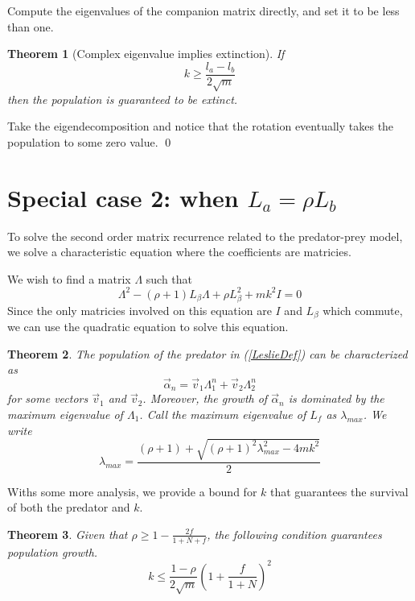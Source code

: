 \documentclass{article}
\newtheorem{theorem}{Theorem}
\begin{document}
\proof Compute the eigenvalues of the companion matrix directly, 
and set it to be less than one. 

\begin{theorem}[Complex eigenvalue implies extinction]
If 
\[
    k \geq \frac {l_a - l_b} {2\sqrt{m}}
\]
then the population is guaranteed to be extinct. 
\end{theorem}

\proof Take the eigendecomposition and notice that the rotation 
eventually takes the population to some zero value. 
\hfill \qed

\section{Special case 2: when $L_a = \rho L_b$}

To solve the second order matrix 
recurrence related to 
the predator-prey model, 
we solve a characteristic equation 
where the coefficients are matricies.

We wish to find a matrix $\Lambda$ such that 
\[
\Lambda^2 - (\rho + 1) L_\beta \Lambda + \rho L_\beta^2+ mk^2 I = 0
\]
Since the only matricies involved on this equation are $I$ and $L_\beta$
which commute, we can use the quadratic equation to solve this equation. 


\begin{theorem}
    The population of the predator in (\ref{LeslieDef}) 
    can be characterized as 
    \[
    \vec \alpha_n = \vec v_1\Lambda_1^{n} + \vec v_2\Lambda_2^{n}
    \]
    for some vectors $\vec v_1$ and $\vec v_2$. Moreover, 
    the growth of $\vec \alpha_n$ is dominated by the maximum eigenvalue 
    of $\Lambda_1$. Call the maximum eigenvalue of $L_f$ 
    as $\lambda_{max}$. We write
    \[
        \lambda_{max} = \frac {
            (\rho + 1) + \sqrt{(\rho + 1)^2 \lambda_{max}^2 - 4mk^2}
        } 2
    \]
\end{theorem}

Withs some more analysis, we provide a bound for $k$ that guarantees 
the survival of both the predator and $k$.

\begin{theorem}
    Given that $\rho \geq 1 - \frac {2f}{1 + N + f}$, the following condition 
    guarantees population growth. 
    \[k \leq \frac {1 - \rho} {2\sqrt{m}} \left(1 + \frac f {1 + N}\right)^2\]
\end{theorem}
\end{document}
